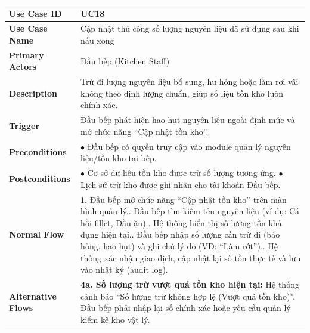 \begin{longtable}{|p{3.5cm}|p{12.5cm}|}
\hline
\textbf{Use Case ID} & UC18 \\ \hline
\textbf{Use Case Name} & Cập nhật thủ công số lượng nguyên liệu đã sử dụng sau khi nấu xong \\ \hline
\textbf{Primary Actors} & Đầu bếp (Kitchen Staff) \\ \hline
\textbf{Description} & Trừ đi lượng nguyên liệu bổ sung, hư hỏng hoặc làm rơi vãi không theo định lượng chuẩn, giúp số liệu tồn kho luôn chính xác. \\ \hline
\textbf{Trigger} & Đầu bếp phát hiện hao hụt nguyên liệu ngoài định mức và mở chức năng ``Cập nhật tồn kho''. \\ \hline
\textbf{Preconditions} & $\bullet$ Đầu bếp có quyền truy cập vào module quản lý nguyên liệu/tồn kho tại bếp. \\ \hline
\textbf{Postconditions} &
$\bullet$ Cơ sở dữ liệu tồn kho được trừ số lượng tương ứng.\newline
$\bullet$ Lịch sử trừ kho được ghi nhận cho tài khoản Đầu bếp. \\ \hline
\textbf{Normal Flow} &
1. Đầu bếp mở chức năng ``Cập nhật tồn kho'' trên màn hình quản lý.\newline
2. Đầu bếp tìm kiếm tên nguyên liệu (ví dụ: Cá hồi fillet, Dầu ăn).\newline
3. Hệ thống hiển thị số lượng tồn khả dụng hiện tại.\newline
4. Đầu bếp nhập số lượng cần trừ đi (báo hỏng, hao hụt) và ghi chú lý do (VD: ``Làm rớt'').\newline
5. Hệ thống xác nhận giao dịch, cập nhật lại số tồn thực tế và lưu vào nhật ký (audit log). \\ \hline
\textbf{Alternative Flows} &
\textbf{4a. Số lượng trừ vượt quá tồn kho hiện tại:} Hệ thống cảnh báo ``Số lượng trừ không hợp lệ (Vượt quá tồn kho)''. Đầu bếp phải nhập lại số chính xác hoặc yêu cầu quản lý kiểm kê kho vật lý. \\ \hline
\end{longtable}

